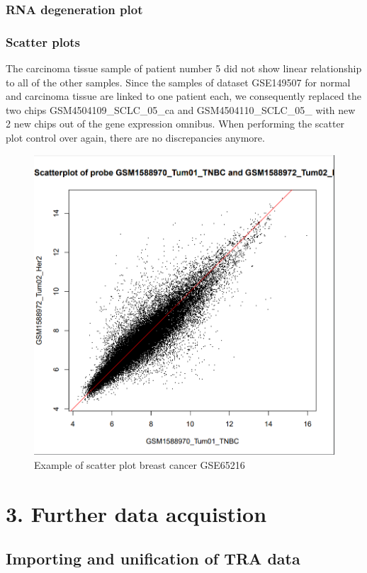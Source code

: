 \documentclass[
]{article}
\begin{document}
\hypertarget{rna-degeneration-plot-1}{%
\subsubsection{RNA degeneration plot}\label{rna-degeneration-plot-1}}

\hypertarget{scatter-plots}{%
\subsubsection{Scatter plots}\label{scatter-plots}}

The carcinoma tissue sample of patient number 5 did not show linear
relationship to all of the other samples. Since the samples of dataset
GSE149507 for normal and carcinoma tissue are linked to one patient
each, we consequently replaced the two chips GSM4504109\_SCLC\_05\_ca
and GSM4504110\_SCLC\_05\_ with new 2 new chips out of the gene
expression omnibus. When performing the scatter plot control over again,
there are no discrepancies anymore.

\begin{figure}

{\centering \includegraphics[width=0.5\linewidth]{images/breast_scatter_example1} 

}

\caption{Example of scatter plot breast cancer GSE65216}\label{fig:Broken chip - lung qc}
\end{figure}

\hypertarget{further-data-acquistion}{%
\section{3. Further data acquistion}\label{further-data-acquistion}}

\hypertarget{importing-and-unification-of-tra-data}{%
\subsection{Importing and unification of TRA
data}\label{importing-and-unification-of-tra-data}}
\end{document}
